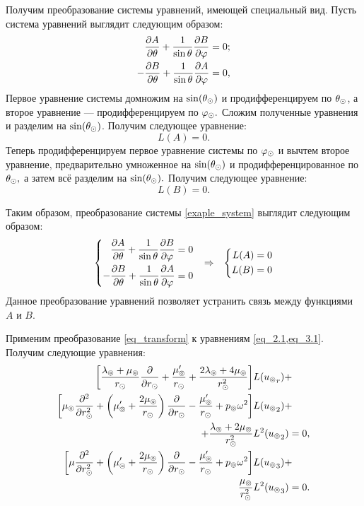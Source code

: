 Получим преобразование системы уравнений, имеющей специальный вид. Пусть система уравнений выглядит следующим образом:
\begin{equation}\label{exaple_system}
\begin{aligned}
\frac{\partial A}{\partial \theta} + \frac{1}{\sin\theta}\frac{\partial B}{\partial\varphi} &= 0;\\
- \frac{\partial B}{\partial\theta} + \frac{1}{\sin\theta}\frac{\partial A}{\partial \varphi}  &= 0,
\end{aligned}
\end{equation}
Первое уравнение системы домножим на $\sin(\theta_\odot)$ и продифференцируем по $\theta_\odot$, а второе уравнение --- продифференцируем по $\varphi_\odot.$ Сложим полученные уравнения и разделим на $\sin(\theta_\odot)$. Получим следующее уравнение:
\begin{equation*}
L(A) = 0.
\end{equation*}
Теперь продифференцируем первое уравнение системы по $\varphi_\odot$ и вычтем второе уравнение, предварительно умноженное на $\sin(\theta_\odot)$ и продифференцированное по $\theta_\odot,$ а затем всё разделим на $\sin(\theta_\odot).$ Получим следующее уравнение:
\begin{equation*}
L(B) = 0.
\end{equation*}

Таким образом, преобразование системы \cref{exaple_system} выглядит следующим образом:
\begin{align}\label{eq_transform}
\left\{\begin{aligned}
\dfrac{\partial A}{\partial \theta} + \dfrac{1}{\sin\theta}\dfrac{\partial B}{\partial\varphi} &= 0\\
- \dfrac{\partial B}{\partial\theta} + \dfrac{1}{\sin\theta}\dfrac{\partial A}{\partial \varphi} &= 0
\end{aligned}\right. 
&& \Rightarrow && 
\left\{\begin{aligned}
L(A) &= 0\\
L(B) &= 0
\end{aligned}\right. 
\end{align}
Данное преобразование уравнений позволяет устранить связь между функциями $A$ и $B.$

Применим преобразование \cref{eq_transform} к уравнениям \cref{eq_2.1,eq_3.1}. Получим следующие уравнения:
\begin{align}
\begin{split}
\left[\frac{\lambda_\circledcirc+\mu_\circledcirc}{r_\odot}\frac{\partial}{\partial r_\odot} + \frac{\mu_\circledcirc'}{r_\odot} + \frac{2\lambda_\circledcirc+4\mu_\circledcirc}{r_\odot^2}\right]&L({u_\circledcirc}_r)+\\
\left[\mu_\circledcirc\frac{\partial^2}{\partial r_\odot^2} + \left(\mu_\circledcirc'+\frac{2\mu_\circledcirc}{r_\odot}\right)\frac{\partial}{\partial r_\odot} - \frac{\mu_\circledcirc'}{r_\odot} + p_\circledcirc\omega^2\right]&L({u_\circledcirc}_2) + \\
 + \frac{\lambda_\circledcirc+2\mu_\circledcirc}{r_\odot^2}&L^2({u_\circledcirc}_2) = 0,
\end{split}\label{eq_2.2}\\
\begin{split}
\left[\mu\frac{\partial^2}{\partial r_\odot^2} + \left(\mu_\circledcirc' + \frac{2\mu_\circledcirc}{r_\odot}\right)\frac{\partial}{\partial r_\odot} - \frac{\mu_\circledcirc'}{r_\odot} + p_\circledcirc\omega^2\right]&L({u_\circledcirc}_3) + \\
\frac{\mu_\circledcirc}{r_\odot^2}&L^2({u_\circledcirc}_3) = 0.\label{eq_3.2}
\end{split}
\end{align}

